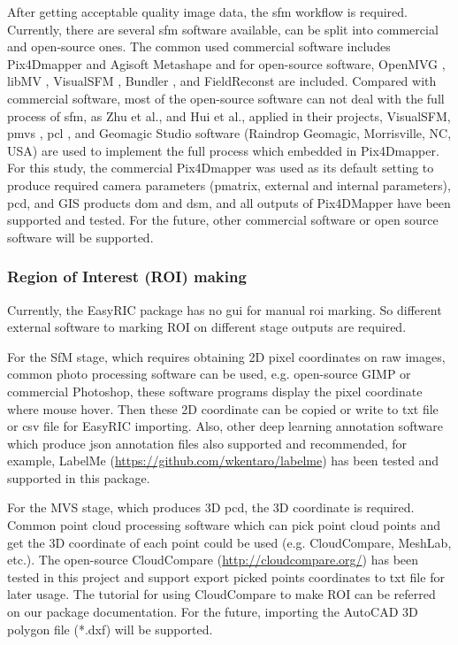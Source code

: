 \documentclass[doublespacing]{configs/bmcart}
\begin{document}
After getting acceptable quality image data, the \acrshort*{sfm} workflow is required. Currently, there are several \acrshort*{sfm} software available, can be split into commercial and open-source ones. The common used commercial software includes Pix4Dmapper and Agisoft Metashape and for open-source software, OpenMVG \cite{openmvg_openmvg_2020}, libMV \cite{mierle_libmv_2020}, VisualSFM \cite{wu_visualsfm_2020}, Bundler \cite{snavely_bundler_2020}, and FieldReconst \cite{naro_fieldreconst_2020} are included. Compared with commercial software, most of the open-source software can not deal with the full process of \acrshort*{sfm}, as Zhu et al., \cite{zhu_quantification_2020} and Hui et al., \cite{hui_image-based_2018} applied in their projects, VisualSFM, \acrfull*{pmvs} \cite{furukawa_accurate_2010}, \acrfull*{pcl} \cite{rusu_3d_2011}, and Geomagic Studio software (Raindrop Geomagic, Morrisville, NC, USA) are used to implement the full process which embedded in Pix4Dmapper. For this study, the commercial Pix4Dmapper was used as its default setting to produce required camera parameters (pmatrix, external and internal parameters), \acrshort*{pcd}, and GIS products \acrshort*{dom} and \acrshort*{dsm}, and all outputs of Pix4DMapper have been supported and tested. For the future, other commercial software or open source software will be supported.

\subsubsection*{Region of Interest (ROI) making}
Currently, the EasyRIC package has no \acrfull*{gui} for manual \acrshort*{roi} marking. So different external software to marking ROI on different stage outputs are required.

For the SfM stage, which requires obtaining 2D pixel coordinates on raw images, common photo processing software can be used, e.g. open-source GIMP or commercial Photoshop, these software programs display the pixel coordinate where mouse hover. Then these 2D coordinate can be copied or write to txt file or csv file for EasyRIC importing. Also, other deep learning annotation software which produce json annotation files also supported and recommended, for example, LabelMe (\url{https://github.com/wkentaro/labelme}) has been tested and supported in this package.

For the MVS stage, which produces 3D \acrshort*{pcd}, the 3D coordinate is required. Common point cloud processing software which can pick point cloud points and get the 3D coordinate of each point could be used (e.g. CloudCompare, MeshLab, etc.). The open-source CloudCompare (\url{http://cloudcompare.org/}) has been tested in this project and support export picked points coordinates to txt file for later usage. The tutorial for using CloudCompare to make ROI can be referred on our package documentation. For the future, importing the AutoCAD 3D polygon file (*.dxf) will be supported.
\end{document}
